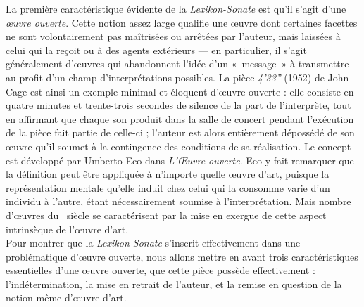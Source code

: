 \documentclass[a4paper,12pt]{article}
\newcommand{\guill}[1]{«~#1~»}
\begin{document}
La première caractéristique évidente de la \emph{Lexikon-Sonate} est qu'il s'agit d'une \emph{œuvre ouverte}. Cette notion assez large qualifie une œuvre dont certaines facettes ne sont volontairement pas maîtrisées ou arrêtées par l'auteur, mais laissées à celui qui la reçoit ou à des agents extérieurs --- en particulier, il s'agit généralement d'œuvres qui abandonnent l'idée d'un \guill{message} à transmettre au profit d'un champ d'interprétations possibles. La pièce \emph{4'33''} (1952) de John Cage est ainsi un exemple minimal et éloquent d'œuvre ouverte : elle consiste en quatre minutes et trente-trois secondes de silence de la part de l'interprète, tout en affirmant que chaque son produit dans la salle de concert pendant l'exécution de la pièce fait partie de celle-ci ; l'auteur est alors entièrement dépossédé de son œuvre qu'il soumet à la contingence des conditions de sa réalisation. Le concept est développé par Umberto Eco dans \emph{L'Œuvre ouverte}. Eco y fait remarquer que la définition peut être appliquée à n'importe quelle œuvre d'art, puisque la représentation mentale qu'elle induit chez celui qui la consomme varie d'un individu à l'autre, étant nécessairement soumise à l'interprétation. Mais nombre d'œuvres du \XXe~siècle se caractérisent par la mise en exergue de cette aspect intrinsèque de l'œuvre d'art. \\
Pour montrer que la \emph{Lexikon-Sonate} s'inscrit effectivement dans une problématique d'œuvre ouverte, nous allons mettre en avant trois caractéristiques essentielles d'une œuvre ouverte, que cette pièce possède effectivement : l'indétermination, la mise en retrait de l'auteur, et la remise en question de la notion même d'œuvre d'art. \\
\end{document}
